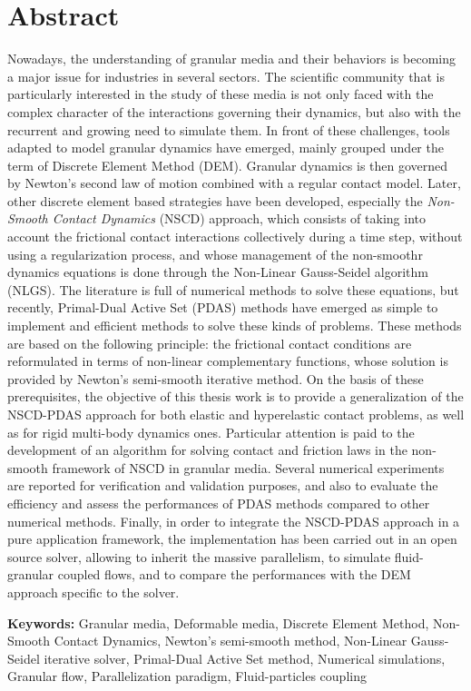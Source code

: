 {}
{}
\chapter*{Abstract}


Nowadays, the understanding of granular media and their behaviors is becoming a major issue for industries in several sectors. The scientific community that is particularly interested in the study of these media is not only faced with the complex character of the interactions governing their dynamics, but also with the recurrent and growing need to simulate them. In front of these challenges, tools adapted to model granular dynamics have emerged, mainly grouped under the term of Discrete Element Method (DEM). Granular dynamics is then governed by Newton's second law of motion combined with a regular contact model. Later, other discrete element based strategies have been developed, especially the \textit{Non-Smooth Contact Dynamics} (NSCD) approach, which consists of taking into account the frictional contact interactions collectively during a time step, without using a regularization process, and whose management of the non-smoothr dynamics equations is done through the Non-Linear Gauss-Seidel algorithm (NLGS). The literature is full of numerical methods to solve these equations, but recently, Primal-Dual Active Set (PDAS) methods have emerged as simple to implement and efficient methods to solve these kinds of problems. These methods are based on the following principle: the frictional contact conditions are reformulated in terms of non-linear complementary functions, whose solution is provided by Newton's semi-smooth iterative method. On the basis of these prerequisites, the objective of this thesis work is to provide a generalization of the NSCD-PDAS approach for both elastic and hyperelastic contact problems, as well as for rigid multi-body dynamics ones. Particular attention is paid to the development of an algorithm for solving contact and friction laws in the non-smooth framework of NSCD in granular media. Several numerical experiments are reported for verification and validation purposes, and also to evaluate the efficiency and assess the performances of PDAS methods compared to other numerical methods. Finally, in order to integrate the NSCD-PDAS approach in a pure application framework, the implementation has been carried out in an open source solver, allowing to inherit the massive parallelism, to simulate fluid-granular coupled flows, and to compare the performances with the DEM approach specific to the solver.\\

\newpage

\textbf{Keywords:} Granular media, Deformable media, Discrete Element Method, Non-Smooth Contact Dynamics, Newton's semi-smooth method, Non-Linear Gauss-Seidel iterative solver, Primal-Dual Active Set method, Numerical simulations, Granular flow, Parallelization paradigm, Fluid-particles coupling